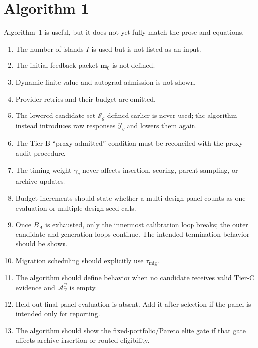 \documentclass[11pt]{article}
\begin{document}
\section{Algorithm 1}

Algorithm~1 is useful, but it does not yet fully match the prose and equations.

\begin{enumerate}
  \item The number of islands $I$ is used but is not listed as an input.

  \item The initial feedback packet $\mathbf m_0$ is not defined.

  \item Dynamic finite-value and autograd admission is not shown.

  \item Provider retries and their budget are omitted.

  \item The lowered candidate set $\mathcal S_g$ defined earlier is never used;
  the algorithm instead introduces raw responses $\mathcal Y_g$ and lowers
  them again.

  \item The Tier-B ``proxy-admitted'' condition must be reconciled with the
  proxy-audit procedure.

  \item The timing weight $\gamma_q$ never affects insertion, scoring, parent
  sampling, or archive updates.

  \item Budget increments should state whether a multi-design panel counts as
  one evaluation or multiple design-seed calls.

  \item Once $B_A$ is exhausted, only the innermost calibration loop breaks;
  the outer candidate and generation loops continue. The intended termination
  behavior should be shown.

  \item Migration scheduling should explicitly use $\tau_{\mathrm{mig}}$.

  \item The algorithm should define behavior when no candidate receives valid
  Tier-C evidence and $\mathcal A_G^C$ is empty.

  \item Held-out final-panel evaluation is absent. Add it after selection if
  the panel is intended only for reporting.

  \item The algorithm should show the fixed-portfolio/Pareto elite gate if that
  gate affects archive insertion or routed eligibility.
\end{enumerate}
\end{document}
